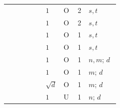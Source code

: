 \begin{xltabular}{\linewidth}{@{}>{\raggedright\arraybackslash}p{0.34\linewidth}>{\raggedright\arraybackslash}p{0.16\linewidth}lc>{\raggedright\arraybackslash}X@{}}
 & $1$ & O & 2 & $s,t$ \\
 & $1$ & O & 2 & $s,t$ \\
 & $1$ & O & 1 & $s,t$ \\
 & $1$ & O & 1 & $s,t$ \\
 & $1$ & O & 1 & $n,m$; $d$ \\
 & $1$ & O & 1 & $m$; $d$ \\
 & $\sqrt d$ & O & 1 & $m$; $d$ \\
 & $1$ & U & 1 & $n$; $d$ \\
\end{xltabular}
